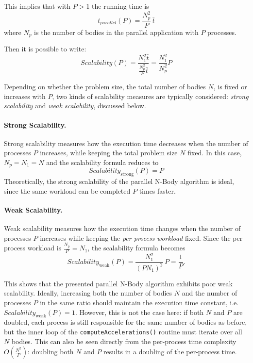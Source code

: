 \documentclass{article}
\begin{document}
This implies that with $P>1$ the running time is
\begin{equation}
t_{{parallel}}(P) = \frac{N_p^2}{P} \, \bar{t}
\end{equation}
where $N_p$ is the number of bodies in the parallel application with $P$ processes.

Then it is possible to write:
\begin{equation}
Scalability(P) = \frac{N^2_1\bar{t}}{\frac{N_p^2}{P}\bar{t}} = \frac{N_1^2}{N_p^2}P
\end{equation}

Depending on whether the problem size, the total number of bodies $N$, is fixed or increases with $P$, two kinds of scalability measures are typically considered: \emph{strong scalability} and \emph{weak scalability}, discussed below.

\paragraph{Strong Scalability.}
Strong scalability measures how the execution time decreases when the number of processes $P$ increases, while keeping the total problem size $N$ fixed.  
In this case, $N_p = N_1 = N$ and the scalability formula reduces to
\[
Scalability_{\text{strong}}(P) = P
\]
Theoretically, the strong scalability of the parallel N-Body algorithm is ideal, since the same workload can be completed $P$ times faster.

\paragraph{Weak Scalability.}
Weak scalability measures how the execution time changes when the number of processes $P$ increases while keeping the \emph{per-process workload} fixed.  
Since the per-process workload is $\tfrac{N_p}{P} = N_1$, the scalability formula becomes
\[
Scalability_{\text{weak}}(P) = \frac{N_1^2}{(P N_1)^2} \, P = \frac{1}{P}.
\]

This shows that the presented parallel N-Body algorithm exhibits poor weak scalability.  
Ideally, increasing both the number of bodies $N$ and the number of processes $P$ in the same ratio should maintain the execution time constant, i.e.\ $Scalability_{\text{weak}}(P) = 1$.  
However, this is not the case here: if both $N$ and $P$ are doubled, each process is still responsible for the same number of bodies as before, but the inner loop of the \texttt{compute\discretionary{}{}{}Accelerations()} routine must iterate over all $N$ bodies.  
This can also be seen directly from the per-process time complexity $O\!\left(\tfrac{N^2}{P}\right)$: doubling both $N$ and $P$ results in a doubling of the per-process time.
\end{document}

